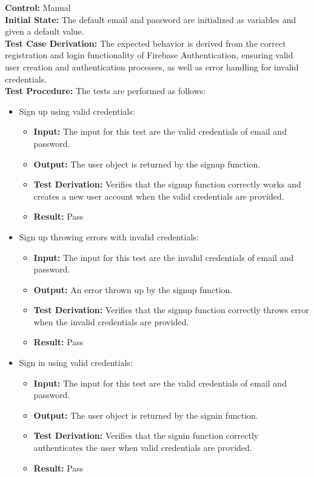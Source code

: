 \documentclass[12pt, titlepage]{article}
\begin{document}
  \textbf{Control:} Manual \\
  \textbf{Initial State:} The default email and password are initialized as variables and given a default value.\\
  \textbf{Test Case Derivation:} The expected behavior is derived from the correct registration and login functionality of Firebase Authentication, ensuring valid user creation and authentication processes, as well as error handling for invalid credentials.\\
  \textbf{Test Procedure:} The tests are performed as follows:\\

  \begin{itemize}
    \item Sign up using valid credentials:
      \begin{itemize}
        \item \textbf{Input:} The input for this test are the valid credentials of email and password.
        \item \textbf{Output:} The user object is returned by the signup function.
        \item \textbf{Test Derivation:} Verifies that the signup function correctly works and creates a new user account when the valid credentials are provided.
        \item \textbf{Result:} Pass 
      \end{itemize}

    \item Sign up throwing errors with invalid credentials:
      \begin{itemize}
        \item \textbf{Input:} The input for this test are the invalid credentials of email and password.
        \item \textbf{Output:} An error thrown up by the signup function.
        \item \textbf{Test Derivation:} Verifies that the signup function correctly throws error when the invalid credentials are provided.
        \item \textbf{Result:} Pass 
      \end{itemize}

    \item Sign in using valid credentials:
      \begin{itemize}
        \item \textbf{Input:} The input for this test are the valid credentials of email and password. 
        \item \textbf{Output:} The user object is returned by the signin function.
        \item \textbf{Test Derivation:}  Verifies that the signin function correctly authenticates the user when valid credentials are provided.
        \item \textbf{Result:} Pass 
      \end{itemize}


\end{itemize}
\end{document}

